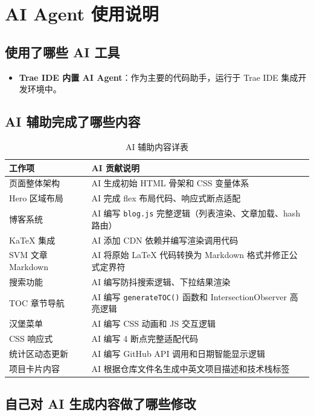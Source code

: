 \documentclass[12pt, a4paper]{article}
\begin{document}
\section{AI Agent 使用说明}

\subsection{使用了哪些 AI 工具}

\begin{itemize}
    \item \textbf{Trae IDE 内置 AI Agent}：作为主要的代码助手，运行于 Trae IDE 集成开发环境中。
\end{itemize}

\subsection{AI 辅助完成了哪些内容}

\begin{table}[H]
\centering
\caption{AI 辅助内容详表}
\begin{tabular}{p{3.5cm}p{8.5cm}}
\toprule
\textbf{工作项} & \textbf{AI 贡献说明} \\
\midrule
页面整体架构 & AI 生成初始 HTML 骨架和 CSS 变量体系 \\
Hero 区域布局 & AI 完成 flex 布局代码、响应式断点适配 \\
博客系统 & AI 编写 \texttt{blog.js} 完整逻辑（列表渲染、文章加载、hash 路由）\\
KaTeX 集成 & AI 添加 CDN 依赖并编写渲染调用代码 \\
SVM 文章 Markdown & AI 将原始 LaTeX 代码转换为 Markdown 格式并修正公式定界符 \\
搜索功能 & AI 编写防抖搜索逻辑、下拉结果渲染 \\
TOC 章节导航 & AI 编写 \texttt{generateTOC()} 函数和 IntersectionObserver 高亮逻辑 \\
汉堡菜单 & AI 编写 CSS 动画和 JS 交互逻辑 \\
CSS 响应式 & AI 编写 4 断点完整适配代码 \\
统计区动态更新 & AI 编写 GitHub API 调用和日期智能显示逻辑 \\
项目卡片内容 & AI 根据仓库文件名生成中英文项目描述和技术栈标签 \\
\bottomrule
\end{tabular}
\end{table}

\subsection{自己对 AI 生成内容做了哪些修改}
\end{document}
